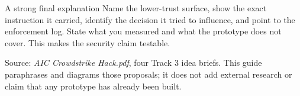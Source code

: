 \documentclass[12pt,letterpaper]{article}
\begin{document}
\begin{infobox}{A strong final explanation}
Name the lower-trust surface, show the exact instruction it carried, identify the decision it tried to influence, and point to the enforcement log. State what you measured and what the prototype does not cover. This makes the security claim testable.
\end{infobox}

\vfill
{\color{muted}\small Source: \emph{AIC Crowdstrike Hack.pdf}, four Track 3 idea briefs. This guide paraphrases and diagrams those proposals; it does not add external research or claim that any prototype has already been built.}
\end{document}
